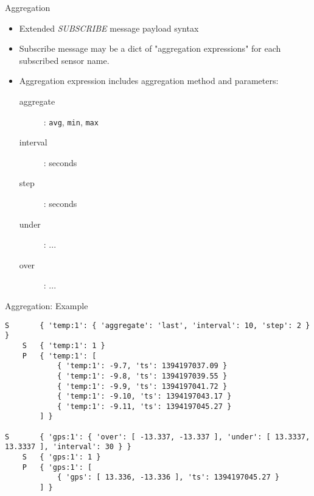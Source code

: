 \documentclass{beamer}
\begin{document}
\begin{frame}{Aggregation}
\begin{itemize}
	\item Extended \emph{SUBSCRIBE} message payload syntax
	\item Subscribe message may be a dict of "aggregation expressions" for each subscribed sensor name.
	\item Aggregation expression includes aggregation method and parameters:
	\begin{description}
		\item[aggregate]: \texttt{avg}, \texttt{min}, \texttt{max}
		\item[interval]: seconds
		\item[step]: seconds
		\item[under]: ...
		\item[over]: ...
	\end{description}
\end{itemize}
\end{frame}

\begin{frame}[fragile]{Aggregation: Example}
\scriptsize
\begin{verbatim}
S       { 'temp:1': { 'aggregate': 'last', 'interval': 10, 'step': 2 } }
    S   { 'temp:1': 1 }
    P   { 'temp:1': [
            { 'temp:1': -9.7, 'ts': 1394197037.09 }
            { 'temp:1': -9.8, 'ts': 1394197039.55 }
            { 'temp:1': -9.9, 'ts': 1394197041.72 }
            { 'temp:1': -9.10, 'ts': 1394197043.17 }
            { 'temp:1': -9.11, 'ts': 1394197045.27 }
        ] }
        
S       { 'gps:1': { 'over': [ -13.337, -13.337 ], 'under': [ 13.3337, 13.3337 ], 'interval': 30 } }
    S   { 'gps:1': 1 }
    P   { 'gps:1': [
            { 'gps': [ 13.336, -13.336 ], 'ts': 1394197045.27 }
        ] }
\end{verbatim}
\end{frame}
\end{document}
